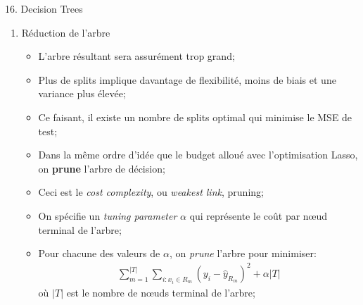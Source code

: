 \documentclass[12pt, titlepage, french]{report}
\begin{document}
\begin{CHPT_SUMM}[label = {DECISION-TREES}]{16. Decision Trees}
\begin{enumerate}
\begin{itemize}
		\item	L'algorithme est dit \textit{greedy} puisqu'il optimise selon l'étape présente et non le reste de l'arbre;
		\item[]	Comme avec la sélection stepwise, on n'a donc \textit{aucune garantie} d'obtenir la \textit{meilleur optimisation};
		\item	À chaque itération, on choisit: 
			\begin{enumerate}
			\item	Une région à splitter $R_{j}$;
			\item	Un prédicteur $X_{k}$;
			\item	Un cut point $s$;
			\end{enumerate}
		\item[]	tel que le split en $R_{j_{1}}$ et $R_{j_{2}}$ minimise :
			\begin{align*}
			\sum_{i:x_{i} \in R_{j_{1}}} (y_{i} - \hat{y}_{R_{j_{1}}})^{2} + 
			\sum_{x_{i} \in R_{j_{2}}} (y_{i} - \hat{y}_{R_{j_{2}}})^{2}
			\end{align*}
		\item[]	jusqu'à ce que le nombre d'observations dans une région soit inférieur à un certain nombre;
		\end{itemize}
%		
	\item[]	Réduction de l'arbre
		\begin{itemize}
		\item	L'arbre résultant sera assurément trop grand;
		\item	Plus de splits implique davantage de flexibilité, moins de biais et une variance plus élevée;
		\item[]	Ce faisant, il existe un nombre de splits optimal qui minimise le MSE de test;
		\item	Dans la même ordre d'idée que le budget alloué avec l'optimisation Lasso, on \textbf{prune} l'arbre de décision;
		\item[]	Ceci est le \textit{cost complexity}, ou \textit{weakest link}, pruning;
		\item	On spécifie un \textit{tuning parameter} $\alpha$ qui représente le \og coût \fg{} par nœud terminal de l'arbre;
		\item	Pour chacune des valeurs de $\alpha$, on \textit{prune} l'arbre pour minimiser: 
			\begin{align*}
			\sum_{m = 1}^{|T|} \sum_{i:x_{i} \in R_{m}} (y_{i} - \hat{y}_{R_{m}})^{2} + \alpha |T|
			\end{align*}
			où $|T|$ est le nombre de nœuds terminal de l'arbre;

\end{itemize}
\end{enumerate}
\end{CHPT_SUMM}
\end{document}
